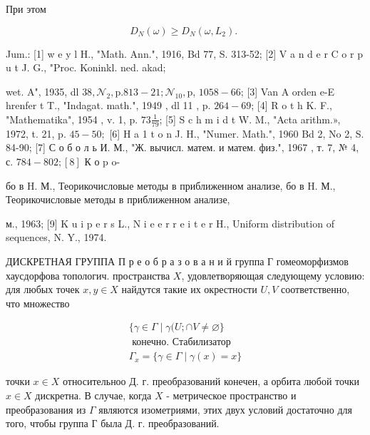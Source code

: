 \documentclass[10pt]{article}
\begin{document}
При этом



\[

D_{N}(\omega) \geqslant D_{N}\left(\omega, L_{2}\right) \text {. }

\]



Jum.: [1] w e y l H., "Math. Ann.", 1916, Bd 77, S. 313-52; [2] V a n d e r C o r p u t J. G., "Proc. Koninkl. ned. akad;

wet. A", 1935, dl $38, \mathcal{N}_{2}, \mathrm{p} .813-21 ; \mathcal{N}_{10}, \mathrm{p}$, $1058-66$; [3] Van A orden e-E hrenfer t T., "Indagat. math.", 1949 , dl 11 , p. $264-69$; [4] R o t h K. F., "Mathematika", 1954 , v. 1, p. $73 \frac{1}{79}$; [5] S c h m i d t W. M., "Acta arithm.», 1972, t. 21, p. $45-50 ;$ [6] H a 1 t o n J. H., "Numer. Math.", 1960 Bd 2, No 2, S. 84-90; [7] С о б о л ь И. М., "Ж. вычисл. матем. и матем. физ.", 1967 , т. 7, № 4, с. $784-802 ;[8]$ К о p o-

бо в H. М., Теорикочисловые методы в приближенном анализе, бо в H. М., Теорикочисловые методы в приближенном анализе,

м., 1963; [9] K u i p e r s L., N i e e r r e i t e r H., Uniform distribution of sequences, N. Y., 1974.



ДИСКРЕТНАЯ ГРУППА П р е о б р а з о в а н и й группа Г гомеоморфизмов хаусдорфова топологич. пространства $X$, удовлетворяющая следующему условию: для любых точек $x, y \in X$ найдутся такие их окрестности $U, V$ соответственно, что множество



\[

\begin{array}{r}

\{\gamma \in \Gamma \mid \gamma(U ; \cap V \neq \varnothing\} \\

\text { конечно. Стабилизатор } \\

\Gamma_{x}=\{\gamma \in \Gamma \mid \gamma(x)=x\}

\end{array}

\]



точки $x \in X$ относительноо Д. г. преобразований конечен, а орбита любой точки $x \in X$ дискретна. В случае, когда $X$ - метрическое пространство и преобразования из $\Gamma$ являются изометриями, этих двух условий достаточно для того, чтобы группа Г была Д. г. преобразований.
\end{document}
